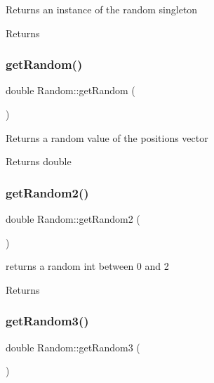 Returns an instance of the random singleton \begin{DoxyReturn}{Returns}

\end{DoxyReturn}
\mbox{\label{classRandom_a41da5ad61d3b9c1cf79865cd899177ce}} 
\subsubsection{\texorpdfstring{get\+Random()}{getRandom()}}
{\footnotesize\ttfamily double Random\+::get\+Random (\begin{DoxyParamCaption}{ }\end{DoxyParamCaption})}

Returns a random value of the positions vector \begin{DoxyReturn}{Returns}
double 
\end{DoxyReturn}
\mbox{\label{classRandom_ad03bbe9b556bbe4dd2b257550dd8dd79}} 
\subsubsection{\texorpdfstring{get\+Random2()}{getRandom2()}}
{\footnotesize\ttfamily double Random\+::get\+Random2 (\begin{DoxyParamCaption}{ }\end{DoxyParamCaption})}

returns a random int between 0 and 2 \begin{DoxyReturn}{Returns}

\end{DoxyReturn}
\mbox{\label{classRandom_af66ee8ebad35ab5af5f89d3df466f363}} 
\subsubsection{\texorpdfstring{get\+Random3()}{getRandom3()}}
{\footnotesize\ttfamily double Random\+::get\+Random3 (\begin{DoxyParamCaption}{ }\end{DoxyParamCaption})}

